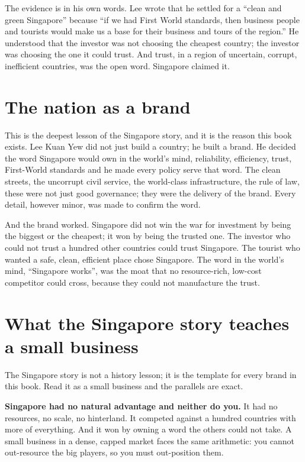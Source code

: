 \documentclass[10pt,twoside,openany]{memoir}
\newcommand{\needspacehead}{\needspace{4\baselineskip}}
\let\oldsection\section
\renewcommand{\section}{\needspacehead\oldsection}
\begin{document}
The evidence is in his own words. Lee wrote that he settled for a
``clean and green Singapore'' because ``if we had First World standards,
then business people and tourists would make us a base for their
business and tours of the region.'' He understood that the investor was
not choosing the cheapest country; the investor was choosing the one it
could trust. And trust, in a region of uncertain, corrupt, inefficient
countries, was the open word. Singapore claimed it.

\section{The nation as a brand}\label{the-nation-as-a-brand}

This is the deepest lesson of the Singapore story, and it is the reason
this book exists. Lee Kuan Yew did not just build a country; he built a
brand. He decided the word Singapore would own in the world's mind,
reliability, efficiency, trust, First-World standards and he made every
policy serve that word. The clean streets, the uncorrupt civil service,
the world-class infrastructure, the rule of law, these were not just
good governance; they were the delivery of the brand. Every detail,
however minor, was made to confirm the word.

And the brand worked. Singapore did not win the war for investment by
being the biggest or the cheapest; it won by being the trusted one. The
investor who could not trust a hundred other countries could trust
Singapore. The tourist who wanted a safe, clean, efficient place chose
Singapore. The word in the world's mind, ``Singapore works'', was the
moat that no resource-rich, low-cost competitor could cross, because
they could not manufacture the trust.

\section{What the Singapore story teaches a small
business}\label{what-the-singapore-story-teaches-a-small-business}

The Singapore story is not a history lesson; it is the template for
every brand in this book. Read it as a small business and the parallels
are exact.

\textbf{Singapore had no natural advantage and neither do you.} It had
no resources, no scale, no hinterland. It competed against a hundred
countries with more of everything. And it won by owning a word the
others could not take. A small business in a dense, capped market faces
the same arithmetic: you cannot out-resource the big players, so you
must out-position them.
\end{document}
